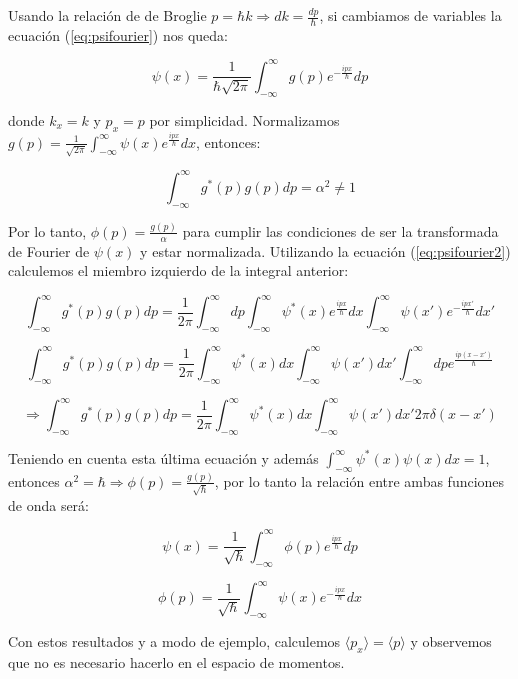 \documentclass[a4paper]{article}
\begin{document}
Usando la relaci\'on de de Broglie $p = \hbar k \Rightarrow dk = \frac{dp}{\hbar}$, si cambiamos de variables la ecuaci\'on (\ref{eq:psifourier}) nos queda:

\begin{equation}
\label{eq:psifourier2}
\psi(x) = \frac{1}{\hbar\sqrt{2\pi}}\int_{-\infty}^{\infty} g(p)e^{-\frac{ipx}{\hbar}}dp
\end{equation}

donde $k_{x} = k$ y $p_{x} = p$ por simplicidad. Normalizamos $g(p) = \frac{1}{\sqrt{2\pi}}\int_{-\infty}^{\infty} \psi(x)e^{\frac{ipx}{\hbar}}dx$, entonces:

$$\int_{-\infty}^{\infty} g^{*}(p)g(p)dp = \alpha^{2} \neq 1$$

Por lo tanto, $\phi(p) = \frac{g(p)}{\alpha}$ para cumplir las condiciones de ser la transformada de Fourier de $\psi(x)$ y estar normalizada. Utilizando la ecuaci\'on (\ref{eq:psifourier2}) calculemos el miembro izquierdo de la integral anterior:

$$\int_{-\infty}^{\infty} g^{*}(p)g(p)dp = \frac{1}{2\pi}\int_{-\infty}^{\infty}dp\int_{-\infty}^{\infty}\psi^{*}(x)e^{\frac{ipx}{\hbar}}dx\int_{-\infty}^{\infty}\psi(x')e^{-\frac{ipx'}{\hbar}}dx'$$

$$\int_{-\infty}^{\infty} g^{*}(p)g(p)dp = \frac{1}{2\pi}\int_{-\infty}^{\infty}\psi^{*}(x)dx\int_{-\infty}^{\infty}\psi(x')dx'\int_{-\infty}^{\infty}dpe^{\frac{ip(x-x')}{\hbar}}$$

$$ \Rightarrow \int_{-\infty}^{\infty} g^{*}(p)g(p)dp = \frac{1}{2\pi}\int_{-\infty}^{\infty}\psi^{*}(x)dx\int_{-\infty}^{\infty}\psi(x')dx'2\pi \delta(x-x')$$

Teniendo en cuenta esta \'ultima ecuaci\'on y adem\'as $ \int_{-\infty}^{\infty}\psi^{*}(x)\psi(x)dx = 1$, entonces $\alpha^{2} = \hbar \Rightarrow \phi(p) = \frac{g(p)}{\sqrt{\hbar}}$, por lo tanto la relaci\'on entre ambas funciones de onda ser\'a:

\begin{equation}
\label{eq:psi}
\psi(x) = \frac{1}{\sqrt{\hbar}}\int_{-\infty}^{\infty}\phi(p)e^{\frac{ipx}{\hbar}}dp
\end{equation}

\begin{equation}
\label{eq:phi}
\phi(p) = \frac{1}{\sqrt{\hbar}}\int_{-\infty}^{\infty}\psi(x)e^{-\frac{ipx}{\hbar}}dx
\end{equation}

Con estos resultados y a modo de ejemplo, calculemos $\langle p_{x} \rangle  = \langle p \rangle$ y observemos que no es necesario hacerlo en el espacio de momentos.
\end{document}
